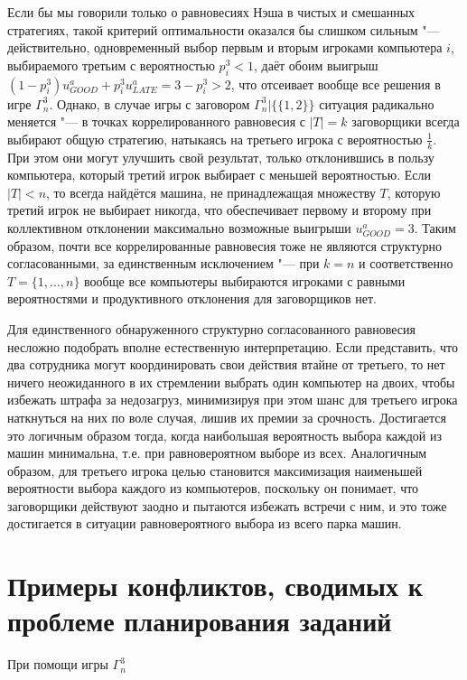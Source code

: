 Если бы мы говорили только о равновесиях Нэша в чистых и смешанных стратегиях, такой критерий оптимальности оказался бы слишком сильным "--- действительно, одновременный выбор первым и вторым игроками компьютера $i$, выбираемого третьим с вероятностью $p_i^3 < 1$, даёт обоим выигрыш $(1 - p_i^3) u^a_{GOOD} + p_i^3 u^a_{LATE} = 3 - p_i^3 > 2$, что отсеивает вообще все решения в игре $\Gamma^3_n$. Однако, в случае игры с заговором $\Gamma^3_n | \{\{1,2\}\}$ ситуация радикально меняется "--- в точках коррелированного равновесия с $\left| T \right| = k$ заговорщики всегда выбирают общую стратегию, натыкаясь на третьего игрока с вероятностью $\frac{1}{k}$. При этом они могут улучшить свой результат, только отклонившись в пользу компьютера, который третий игрок выбирает с меньшей вероятностью. Если $\left| T \right| < n$, то всегда найдётся машина, не принадлежащая множеству $T$, которую третий игрок не выбирает никогда, что обеспечивает первому и второму при коллективном отклонении максимально возможные выигрыши $u^a_{GOOD} = 3$. Таким образом, почти все коррелированные равновесия тоже не являются структурно согласованными, за единственным исключением "--- при $k = n$ и соответственно $T = \{1, \ldots, n\}$ вообще все компьютеры выбираются игроками с равными вероятностями и продуктивного отклонения для заговорщиков нет.

Для единственного обнаруженного структурно согласованного равновесия несложно подобрать вполне естественную интерпретацию. Если представить, что два сотрудника могут координировать свои действия втайне от третьего, то нет ничего неожиданного в их стремлении выбрать один компьютер на двоих, чтобы избежать штрафа за недозагруз, минимизируя при этом шанс для третьего игрока наткнуться на них по воле случая, лишив их премии за срочность. Достигается это логичным образом тогда, когда наибольшая вероятность выбора каждой из машин минимальна, т.е. при равновероятном выборе из всех. Аналогичным образом, для третьего игрока целью становится максимизация наименьшей вероятности выбора каждого из компьютеров, поскольку он понимает, что заговорщики действуют заодно и пытаются избежать встречи с ним, и это тоже достигается в ситуации равновероятного выбора из всего парка машин.

\section{Примеры конфликтов, сводимых к проблеме планирования заданий}\label{sec:ch2/sec6}

При помощи игры $\Gamma^3_n$

\FloatBarrier
